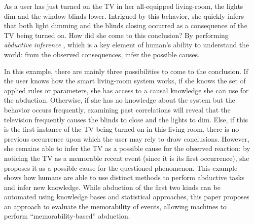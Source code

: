\documentclass[conference]{IEEEtran}
\begin{document}
As a user has just turned on the TV in her all-equipped living-room, the
lights dim and the window blinds lower. Intrigued by this behavior, she
quickly infers that both light dimming and the blinds closing occurred as a
consequence of the TV being turned on. How did she come to this conclusion?
By performing \emph{abductive inference} \cite{magnani_abduction_2011}, which
is a key element of human's ability to understand the world: from the
observed consequences, infer the possible causes.

In this example, there are mainly three possibilities to come to the
conclusion. If the user knows how the smart living-room system works, if she
knows the set of applied rules or parameters, she has access to a causal
knowledge she can use for the abduction. Otherwise, if she has no knowledge
about the system but the behavior occurs frequently, examining past
correlations will reveal that the television frequently causes the blinds to
close and the lights to dim. Else, if this is the first instance of the TV
being turned on in this living-room, there is no previous occurrence upon
which the user may rely to draw conclusions. However, she remains able to
infer the TV as a possible cause for the observed reaction: by noticing the
TV as a memorable recent event (since it is its first occurrence), she
proposes it as a possible cause for the questioned phenomenon. This example
shows how humans are able to use distinct methods to perform abductive tasks
and infer new knowledge. While abduction of the first two kinds can be
automated using knowledge bases and statistical approaches, this paper
proposes an approach to evaluate the memorability of events, allowing
machines to perform ``memorability-based'' abduction.



\end{document}
